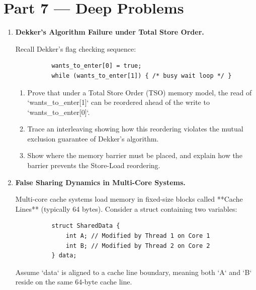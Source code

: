 \documentclass[12pt, a4paper]{book}
\begin{document}
\section{Part 7 --- Deep Problems}

\begin{deepbox}
\begin{enumerate}[label=\textbf{D\arabic*.}]
  \item \textbf{Dekker's Algorithm Failure under Total Store Order.}
  
        Recall Dekker's flag checking sequence:
        \begin{verbatim}
          wants_to_enter[0] = true;
          while (wants_to_enter[1]) { /* busy wait loop */ }
        \end{verbatim}
        
        \begin{enumerate}[label=(\alph*)]
          \item Prove that under a Total Store Order (TSO) memory model, the read of `wants_to_enter[1]` can be reordered ahead of the write to `wants_to_enter[0]`.
          \item Trace an interleaving showing how this reordering violates the mutual exclusion guarantee of Dekker's algorithm.
          \item Show where the memory barrier must be placed, and explain how the barrier prevents the Store-Load reordering.
        \end{enumerate}

  \item \textbf{False Sharing Dynamics in Multi-Core Systems.}
  
        Multi-core cache systems load memory in fixed-size blocks called **Cache Lines** (typically 64 bytes).
        Consider a struct containing two variables:
        \begin{verbatim}
          struct SharedData {
              int A; // Modified by Thread 1 on Core 1
              int B; // Modified by Thread 2 on Core 2
          } data;
        \end{verbatim}
        Assume `data` is aligned to a cache line boundary, meaning both `A` and `B` reside on the same 64-byte cache line.
        

\end{enumerate}
\end{deepbox}
\end{document}
